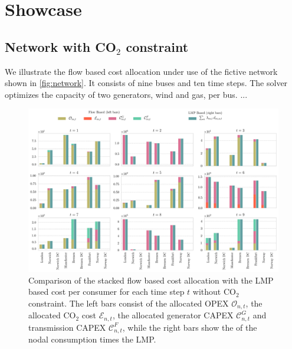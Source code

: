 \documentclass[11pt]{article}
\newcommand{\allocateCapexGeneration}[1][n]{\mathcal{C}^{G}_{#1,t}}
\newcommand{\allocateCapexFlow}[1][n]{\mathcal{C}^{F}_{#1,t}}
\newcommand{\allocateOpex}[1][n]{\mathcal{O}_{#1,t}}
\newcommand{\allocateEmissionCost}[1][n]{\mathcal{E}_{#1,t}}
\begin{document}
\section*{Showcase}

\subsection*{Network with CO$_2$ constraint}
We illustrate the flow based cost allocation under use of the fictive network shown in \cref{fig:network}. It consists of nine buses and ten time steps. The solver optimizes the capacity of two generators, wind and gas, per bus. ...   

\begin{figure}[h]
    \centering
    \includegraphics[width=\textwidth]{compare_allocation.png}
    \caption{Comparison of the stacked flow based cost allocation with the LMP based cost per consumer for each time step $t$ without CO$_2$ constraint. The left bars consist of the allocated OPEX $\allocateOpex$, the allocated CO$_2$ cost $\allocateEmissionCost$, the allocated generator CAPEX $\allocateCapexGeneration$ and transmission CAPEX $\allocateCapexFlow$, while the right bars show the of the nodal consumption times the LMP. }
    \label{fig:cost_allocation}
\end{figure}
\end{document}
